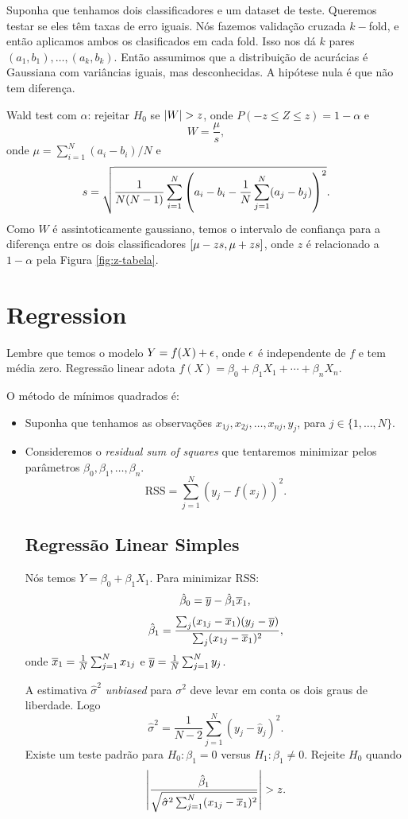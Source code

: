 \documentclass[a4paper,fleqn,12pt]{article}
\begin{document}
Suponha que tenhamos dois classificadores e um dataset de teste. Queremos testar se eles têm taxas de erro iguais. Nós fazemos validação cruzada $k-$fold, e então aplicamos ambos os clasificados em cada fold. Isso nos dá $k$ pares $(a_1, b_1), \ldots, (a_k, b_k)$. Então assumimos que a distribuição de acurácias é Gaussiana com variâncias iguais, mas desconhecidas. A hipótese nula é que não tem diferença.

Wald test com $\alpha$: rejeitar $H_0$ se $\abs{W} > z$, onde $P(-z \leq Z \leq z) = 1-\alpha$ e
$$
W = \frac{\mu}{s},
$$
onde $\mu = \sum_{i=1}^N (a_i - b_i)/N$ e
$$
s = \sqrt{\frac{1}{N(N-1)}\sum_{i=1}^N \qty(a_i-b_i-\frac{1}{N}\sum_{j=1}^N (a_j-b_j))^2}.
$$
Como $W$ é assintoticamente gaussiano, temos o intervalo de confiança para a diferença entre os dois classificadores $\qty[\mu - zs, \mu + zs]$, onde $z$ é relacionado a $1-\alpha$ pela Figura \ref{fig:z-tabela}.

\section{Regression}

Lembre que temos o modelo $Y = f(X) + \epsilon$, onde $\epsilon$ é independente de $f$ e tem média zero. Regressão linear adota $f(X) = \beta_0 + \beta_1 X_1 + \cdots + \beta_n X_n$.

O método de mínimos quadrados é:
\begin{itemize}
\item Suponha que tenhamos as observações $x_{1j}, x_{2j}, \ldots, x_{nj}, y_j$, para $j \in \{1, \ldots, N\}$.
\item Consideremos o \textit{residual sum of squares} que tentaremos minimizar pelos parâmetros $\beta_0, \beta_1, \ldots, \beta_n$.
$$
\text{RSS} = \sum_{j=1}^N (y_j - f(x_j))^2.
$$

\subsection{Regressão Linear Simples}

Nós temos $Y = \beta_0 + \beta_1 X_1$. Para minimizar RSS:
$$
\hat{\beta}_0 = \overline{y} - \hat{\beta}_1 \overline{x}_1,
$$
$$
\hat{\beta}_1 = \frac{\sum_j (x_{1j} - \overline{x}_1) (y_j - \overline{y})}{\sum_j (x_{1j}-\overline{x}_1)^2},
$$
onde $\overline{x}_1 = \frac{1}{N} \sum_{j=1}^N x_{1j}$ e $\overline{y} = \frac{1}{N} \sum_{j=1}^N y_j$.

A estimativa $\hat{\sigma}^2$ \textit{unbiased} para $\sigma^2$ deve levar em conta os dois graus de liberdade. Logo
$$
\hat{\sigma}^2 = \frac{1}{N-2} \sum_{j=1}^N (y_j - \hat{y}_j)^2.
$$
Existe um teste padrão para $H_0: \beta_1 = 0$ versus $H_1: \beta_1 \neq 0$. Rejeite $H_0$ quando
$$
\abs{\frac{\hat{\beta}_1}{\sqrt{\hat{\sigma}^2 \sum_{j=1}^N (x_{1j}-\overline{x}_1)^2}}}>z.
$$
\end{itemize}
\end{document}
